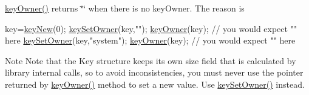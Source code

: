 \hyperlink{group__keyname_gaf6485fb8599714b6bbd830cf915ffea5}{key\-Owner()} returns \char`\"{}\char`\"{} when there is no key\-Owner. The reason is 
\begin{DoxyCode}
key=\hyperlink{group__key_gaf6893c038b3ebee90c73a9ea8356bebf}{keyNew}(0);
\hyperlink{group__keyname_ga88d6ec200ba0707b7c1b4a88133d2be4}{keySetOwner}(key,\textcolor{stringliteral}{""});
\hyperlink{group__keyname_gaf6485fb8599714b6bbd830cf915ffea5}{keyOwner}(key); \textcolor{comment}{// you would expect "" here}
\hyperlink{group__keyname_ga88d6ec200ba0707b7c1b4a88133d2be4}{keySetOwner}(key,\textcolor{stringliteral}{"system"});
\hyperlink{group__keyname_gaf6485fb8599714b6bbd830cf915ffea5}{keyOwner}(key); \textcolor{comment}{// you would expect "" here}
\end{DoxyCode}


\begin{DoxyNote}{Note}
Note that the Key structure keeps its own size field that is calculated by library internal calls, so to avoid inconsistencies, you must never use the pointer returned by \hyperlink{group__keyname_gaf6485fb8599714b6bbd830cf915ffea5}{key\-Owner()} method to set a new value. Use \hyperlink{group__keyname_ga88d6ec200ba0707b7c1b4a88133d2be4}{key\-Set\-Owner()} instead.
\end{DoxyNote}

